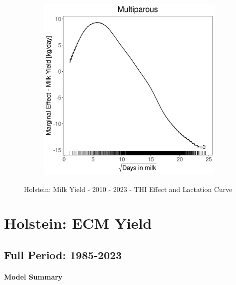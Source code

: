 \begin{figure}[H]
\begin{subfigure}[b]{0.45\textwidth}
    \end{subfigure}
    \hspace{0.05\textwidth} %
    \begin{subfigure}[b]{0.45\textwidth}
        \centering
        \includegraphics[width=\textwidth]{thesis/figures/models/milk/after2010/ho_milk_after2010/ho_milk_after2010_marginal_dim_milk_multi.png}
    \end{subfigure}
    \caption[]{Holstein: Milk Yield - 2010 - 2023 - THI Effect and Lactation Curve}
    \label{fig:main}
\end{figure}

\section{Holstein: ECM Yield}
\subsection{Full Period: 1985-2023}\label{model:ho_ecm_full}
\paragraph{Model Summary} \quad \\

